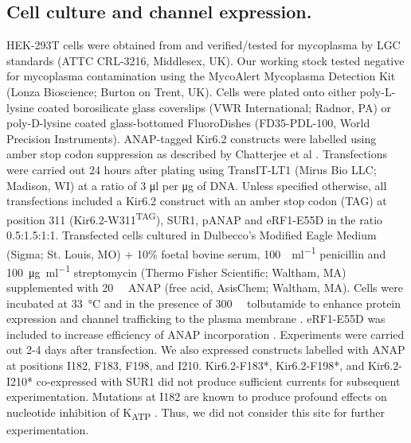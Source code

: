 \documentclass[10pt,lineno, doublespacing]{elife_modified}
\begin{document}
\subsection{Cell culture and channel expression.}
HEK-293T cells were obtained from and verified/tested for mycoplasma by LGC standards (ATTC CRL-3216, Middlesex, UK).
Our working stock tested negative for mycoplasma contamination using the MycoAlert Mycoplasma Detection Kit (Lonza Bioscience; Burton on Trent, UK).
Cells were plated onto either poly-{\small L}-lysine coated borosilicate glass coverslips (VWR International; Radnor, PA) or poly-{\small D}-lysine coated glass-bottomed FluoroDishes (FD35-PDL-100, World Precision Instruments).
ANAP-tagged Kir6.2 constructs were labelled using amber stop codon suppression as described by Chatterjee et al \citep{RN17}.
Transfections were carried out 24 hours after plating using TransIT-LT1 (Mirus Bio LLC; Madison, WI) at a ratio of 3 \si{\micro\litre} per \si{\micro\gram} of DNA.
Unless specified otherwise, all transfections included a Kir6.2 construct with an amber stop codon (TAG) at position 311 (Kir6.2-W311\textsuperscript{TAG}), SUR1, pANAP and eRF1-E55D in the ratio 0.5:1.5:1:1.
Transfected cells cultured in Dulbecco’s Modified Eagle Medium (Sigma; St. Louis, MO) + 10\% foetal bovine serum, \SI{100}{\Unit\per\milli\litre} penicillin and \SI{100}{\micro\gram\per\milli\litre} streptomycin (Thermo Fisher Scientific; Waltham, MA) supplemented with \SI{20}{\milli\Molar} ANAP (free acid, AsisChem; Waltham, MA).
Cells were incubated at \SI{33}{\degreeCelsius} and in the presence of \SI{300}{\micro\Molar} tolbutamide to enhance protein expression and channel trafficking to the plasma membrane \citep{RN106, RN49}.
eRF1-E55D was included to increase efficiency of ANAP incorporation \citep{RN42}.
Experiments were carried out 2-4 days after transfection.
We also expressed constructs labelled with ANAP at positions I182, F183, F198, and I210.
Kir6.2-F183*, Kir6.2-F198*, and Kir6.2-I210* co-expressed with SUR1 did not produce sufficient currents for subsequent experimentation.
Mutations at I182 are known to produce profound effects on nucleotide inhibition of K\textsubscript{ATP} \citep{RN107}.
Thus, we did not consider this site for further experimentation.
\end{document}
